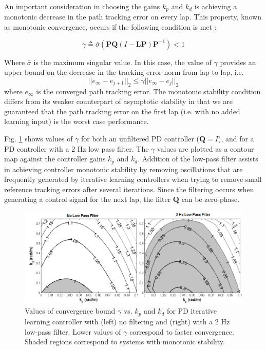 \documentclass[letterpaper, 10 pt, conference]{ieeeconf}  %
\begin{document}
 An important consideration in choosing the gains $k_p$ and $k_d$ is achieving a monotonic decrease in the path tracking error on every lap. 
 This property, known as monotonic convergence, occurs if the following condition is met \cite{bristow}:

\begin{equation}
	\gamma \triangleq \bar{\sigma}(\mathbf{P}\mathbf{Q}(I-\mathbf{L}\mathbf{P})\mathbf{P}^{-1}) < 1
	\label{eq:MS}
\end{equation}
	
Where $\bar{\sigma}$ is the maximum singular value. In this case, the value of $\gamma$ provides an upper bound on the decrease in the tracking error norm from lap to lap, i.e. 
\begin{equation}
	||e_\infty - e_{j+1}||_2 \leq \gamma ||e_\infty-e_j||_2
\end{equation}
where $e_\infty$ is the converged path tracking error. The monotonic stability condition differs from its weaker counterpart of asymptotic stability in that we are guaranteed that 
 the path tracking error on the first lap (i.e. with no added learning input) is the worst case performance.

Fig. \ref{fig:stabPlot} shows values of $\gamma$ for both an unfiltered PD controller ($\mathbf{Q} = I$), and for a PD controller with a 2 Hz low pass filter. The $\gamma$ values are plotted as a
contour map against the controller gains $k_p$ and $k_d$. Addition of the low-pass filter
assists in achieving controller monotonic stability by removing oscillations that are frequently generated by iterative learning controllers when trying to remove small reference tracking
errors after several iterations. Since the filtering occurs when generating a control signal for the next lap, the filter $\mathbf{Q}$ can be zero-phase. 

\begin{figure}
\centering
\includegraphics[width=3.5 in]{figures/MonotonicStability.png}
\caption{Values of convergence bound $\gamma$ vs. $k_p$ and $k_d$ for PD iterative learning controller with (left) no filtering and (right) with a 2 Hz low-pass filter. Lower values of $\gamma$ correspond to faster convergence.
Shaded regions correspond to systems with monotonic stability. }
\label{fig:stabPlot}
\end{figure}
\end{document}
